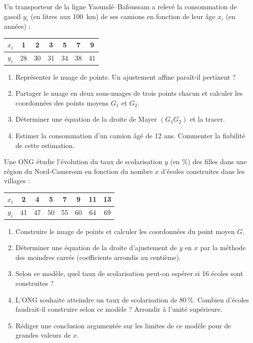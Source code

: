 \documentclass[11pt]{article}
\begin{document}
\begin{exercice}
Un transporteur de la ligne Yaoundé--Bafoussam a relevé la consommation de gasoil $y_i$ (en litres aux \SI{100}{km}) de ses camions en fonction de leur âge $x_i$ (en années) :

\begin{center}
\begin{tabular}{|c|c|c|c|c|c|c|}
\hline
$x_i$ & 1 & 2 & 3 & 5 & 7 & 9 \\
\hline
$y_i$ & 28 & 30 & 31 & 34 & 38 & 41 \\
\hline
\end{tabular}
\end{center}

\begin{enumerate}
\item Représenter le nuage de points. Un ajustement affine paraît-il pertinent ?
\item Partager le nuage en deux sous-nuages de trois points chacun et calculer les coordonnées des points moyens $G_1$ et $G_2$.
\item Déterminer une équation de la droite de Mayer $(G_1G_2)$ et la tracer.
\item Estimer la consommation d'un camion âgé de 12 ans. Commenter la fiabilité de cette estimation.
\end{enumerate}
\end{exercice}

\begin{exercice}
Une ONG étudie l'évolution du taux de scolarisation $y$ (en \%) des filles dans une région du Nord-Cameroun en fonction du nombre $x$ d'écoles construites dans les villages :

\begin{center}
\begin{tabular}{|c|c|c|c|c|c|c|c|}
\hline
$x_i$ & 2 & 4 & 5 & 7 & 9 & 11 & 13 \\
\hline
$y_i$ & 41 & 47 & 50 & 55 & 60 & 64 & 69 \\
\hline
\end{tabular}
\end{center}

\begin{enumerate}
\item Construire le nuage de points et calculer les coordonnées du point moyen $G$.
\item Déterminer une équation de la droite d'ajustement de $y$ en $x$ par la méthode des moindres carrés (coefficients arrondis au centième).
\item Selon ce modèle, quel taux de scolarisation peut-on espérer si 16 écoles sont construites ?
\item L'ONG souhaite atteindre un taux de scolarisation de 80\,\%. Combien d'écoles faudrait-il construire selon ce modèle ? Arrondir à l'unité supérieure.
\item Rédiger une conclusion argumentée sur les limites de ce modèle pour de grandes valeurs de $x$.
\end{enumerate}
\end{exercice}
\end{document}
